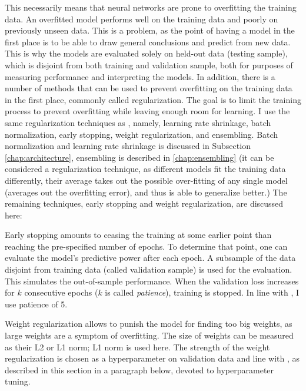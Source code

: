 		This necessarily means that neural networks are prone to overfitting the training data. An overfitted model performs well on the training data and poorly on previously unseen data. This is a problem, as the point of having a model in the first place is to be able to draw general conclusions and predict from new data. This is why the models are evaluated solely on held-out data (testing sample), which is disjoint from both training and validation sample, both for purposes of measuring performance and interpreting the models. In addition, there is a number of methods that can be used to prevent overfitting on the training data in the first place, commonly called regularization. The goal is to limit the training process to prevent overfitting while leaving enough room for learning. I use the same regularization techniques as \cite{gu2020empirical}, namely, learning rate shrinkage, batch normalization, early stopping, weight regularization, and ensembling. Batch normalization and learning rate shrinkage is discussed in Subsection \ref{chap:architecture}, ensembling is described in \ref{chap:ensembling} (it can be considered a regularization technique, as different models fit the training data differently, their average takes out the possible over-fitting of any single model (averages out the overfitting error), and thus is able to generalize better.) The remaining techniques, early stopping and weight regularization, are discussed here: 
		
		Early stopping amounts to ceasing the training at some earlier point than reaching the pre-specified number of epochs. To determine that point, one can evaluate the model's predictive power after each epoch. A subsample of the data disjoint from training data (called validation sample) is used for the evaluation. This simulates the out-of-sample performance. When the validation loss increases for $k$ consecutive epochs ($k$ is called \textit{patience}), training is stopped. In line with \cite{gu2020empirical}, I use patience of 5. 
		
		Weight regularization allows to punish the model for finding too big weights, as large weights are a symptom of overfitting. The size of weights can be measured as their L2 or L1 norm; L1 norm is used here. The strength of the weight regularization is chosen as a hyperparameter on validation data and line with \cite{gu2020empirical}, as described in this section in a paragraph below, devoted to hyperparameter tuning. 
		
